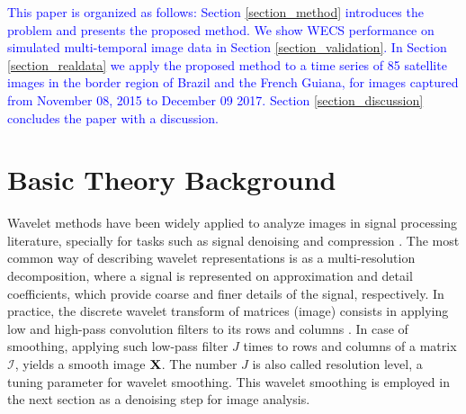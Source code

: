 \documentclass[journal]{IEEEtran}
\newcommand{\vX}{{\textbf X}}
\begin{document}



\textcolor{blue}{This paper is organized as follows:
Section \ref{section_method} introduces the problem and presents the proposed method. We show WECS performance on simulated multi-temporal image data in Section \ref{section_validation}. In Section \ref{section_realdata} we apply the proposed method to a time series of 85 satellite images in the border region of Brazil and the French Guiana, for  images captured from November 08, 2015 to December 09 2017.  Section \ref{section_discussion} concludes the paper with a discussion.}



\section{Basic Theory Background}\label{section_theroy}

Wavelet methods have been widely applied to analyze images in signal processing literature, specially for tasks such as signal denoising and compression \cite{mallat1998wavelet}. The most common way of describing wavelet representations is as a multi-resolution decomposition, where a signal is represented on approximation and detail coefficients, which provide coarse and finer details of the signal, respectively. In practice, the discrete wavelet transform of matrices (image) consists in applying low and high-pass convolution filters to its rows and columns \cite{mallat1989theory}. In case of smoothing, applying such low-pass filter $J$ times to rows and columns of a matrix $\mathcal{I}$, yields a smooth image $\vX$. The number $J$ is also called resolution level, a tuning parameter for wavelet smoothing. This wavelet smoothing is employed in the next section as a denoising step for image analysis.
\end{document}
